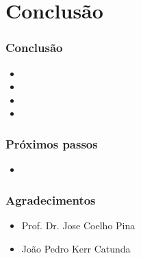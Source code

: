 \documentclass{beamer}
\begin{document}
\section{Conclusão}

\begin{frame}
  \frametitle{Conclusão}
  \begin{itemize}
    \item
    \item
    \item
    \item
  \end{itemize}
\end{frame}

\begin{frame}
  \frametitle{Próximos passos}
  \begin{itemize}
    \item
  \end{itemize}
\end{frame}

\begin{frame}
  \frametitle{Agradecimentos}
  \begin{itemize}
    \item Prof. Dr. Jose Coelho Pina
    \item João Pedro Kerr Catunda
  \end{itemize}
\end{frame}
\end{document}
